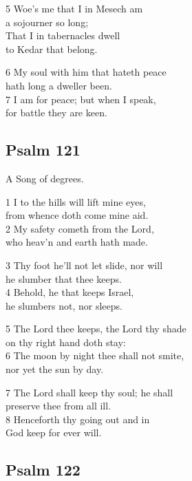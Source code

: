 \begin{multicols}{3}
5 Woe’s me that I in Mesech am\\
a sojourner so long;\\
That I in tabernacles dwell\\
to Kedar that belong.

6 My soul with him that hateth peace\\
hath long a dweller been.\\
7 I am for peace; but when I speak,\\
for battle they are keen.

\begin{center}
\quad{}\quad{}
\end{center}

\subsection*{Psalm 121}

A Song of degrees.

1 I to the hills will lift mine eyes,\\
from whence doth come mine aid.\\
2 My safety cometh from the Lord,\\
who heav’n and earth hath made.

3 Thy foot he’ll not let slide, nor will\\
he slumber that thee keeps.\\
4 Behold, he that keeps Israel,\\
he slumbers not, nor sleeps.

5 The Lord thee keeps, the Lord thy shade\\
on thy right hand doth stay:\\
6 The moon by night thee shall not smite,\\
nor yet the sun by day.

7 The Lord shall keep thy soul; he shall\\
preserve thee from all ill.\\
8 Henceforth thy going out and in\\
God keep for ever will.

\begin{center}
\quad{}\quad{}
\end{center}

\subsection*{Psalm 122}


\end{multicols}
